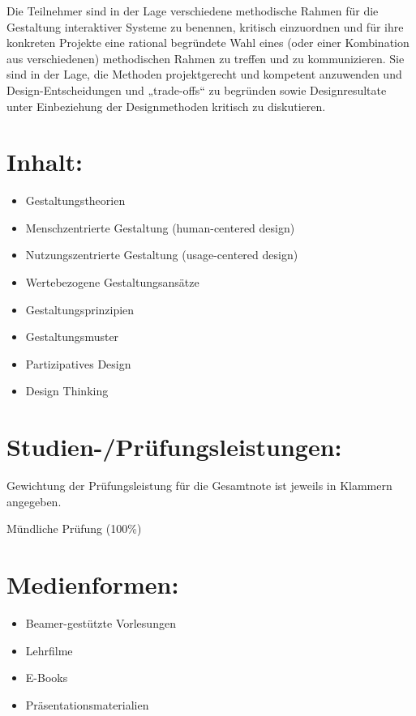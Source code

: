 Die Teilnehmer sind in der Lage verschiedene methodische Rahmen für die
Gestaltung interaktiver Systeme zu benennen, kritisch einzuordnen und
für ihre konkreten Projekte eine rational begründete Wahl eines (oder
einer Kombination aus verschiedenen) methodischen Rahmen zu treffen und
zu kommunizieren. Sie sind in der Lage, die Methoden projektgerecht und
kompetent anzuwenden und Design-Entscheidungen und „trade-offs`` zu
begründen sowie Designresultate unter Einbeziehung der Designmethoden
kritisch zu diskutieren.

\section*{Inhalt:}\label{inhalt-4}

\begin{itemize}
\tightlist
\item
  Gestaltungstheorien
\item
  Menschzentrierte Gestaltung (human-centered design)
\item
  Nutzungszentrierte Gestaltung (usage-centered design)
\item
  Wertebezogene Gestaltungsansätze
\item
  Gestaltungsprinzipien
\item
  Gestaltungsmuster
\item
  Partizipatives Design
\item
  Design Thinking
\end{itemize}

\section*{Studien-/Prüfungsleistungen:}\label{studien-pruxfcfungsleistungen-4}

Gewichtung der Prüfungsleistung für die Gesamtnote ist jeweils in
Klammern angegeben.

Mündliche Prüfung (100\%)

\section*{Medienformen:}\label{medienformen-4}

\begin{itemize}
\tightlist
\item
  Beamer-gestützte Vorlesungen
\item
  Lehrfilme
\item
  E-Books
\item
  Präsentationsmaterialien
\end{itemize}

